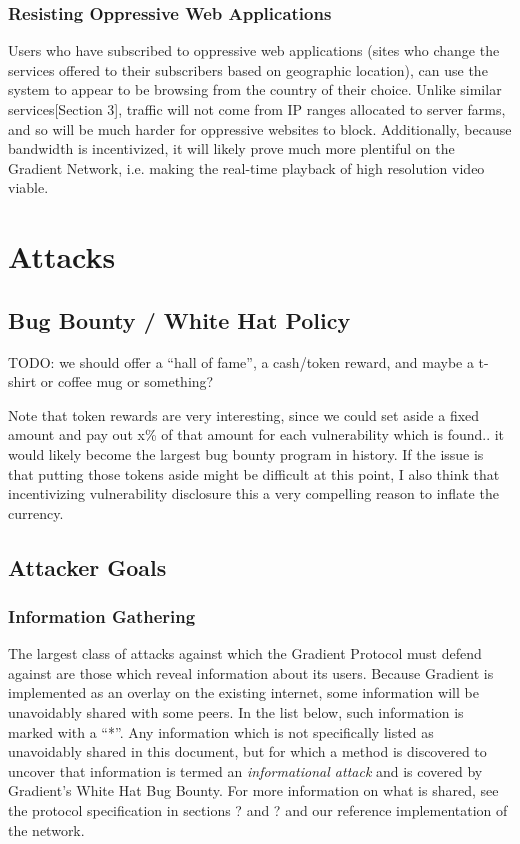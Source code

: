 \documentclass{article}
\begin{document}
\subsubsection{Resisting Oppressive Web Applications}

Users who have subscribed to oppressive web applications (sites who change the services offered to their subscribers based on geographic location), can use the system to appear to be browsing from the country of their choice. Unlike similar services[Section 3], traffic will not come from IP ranges allocated to server farms, and so will be much harder for oppressive websites to block. Additionally, because bandwidth is incentivized, it will likely prove much more plentiful on the Gradient Network, i.e. making the real-time playback of high resolution video viable.

\section{Attacks}

\subsection{Bug Bounty / White Hat Policy}

TODO: we should offer a “hall of fame”, a cash/token reward, and maybe a t-shirt or coffee mug or something?

Note that token rewards are very interesting, since we could set aside a fixed amount and pay out x\% of that amount for each vulnerability which is found.. it would likely become the largest bug bounty program in history. If the issue is that putting those tokens aside might be difficult at this point, I also think that incentivizing vulnerability disclosure this a very compelling reason to inflate the currency.

\subsection{Attacker Goals}

\subsubsection{Information Gathering}

The largest class of attacks against which the Gradient Protocol must defend against are those which reveal information about its users. Because Gradient is implemented as an overlay on the existing internet, some information will be unavoidably shared with some peers. In the list below, such information is marked with a “*”. Any information which is not specifically listed as unavoidably shared in this document, but for which a method is discovered to uncover that information is termed an \emph{informational attack} and is covered by Gradient’s White Hat Bug Bounty. For more information on what is shared, see the protocol specification in sections ? and ? and our reference implementation of the network.
\end{document}
